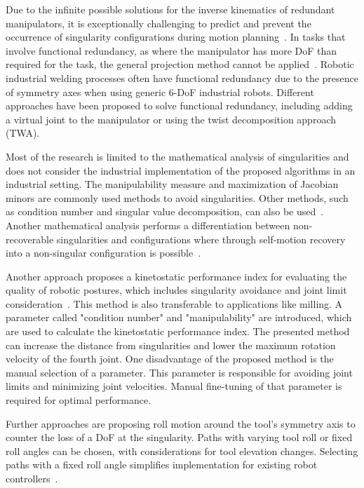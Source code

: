 Due to the infinite possible solutions for the inverse kinematics of redundant manipulators, it is exceptionally challenging to predict and prevent the occurrence of singularity configurations during motion planning~\cite{Shi.2021}. In tasks that involve functional redundancy, as where the manipulator has more \acrshort{DoF} than required for the task, the general projection method cannot be applied~\cite{Wei.2014}. Robotic industrial welding processes often have functional redundancy due to the presence of symmetry axes when using generic 6-\acrshort{DoF} industrial robots. Different approaches have been proposed to solve functional redundancy, including adding a virtual joint to the manipulator or using the twist decomposition approach (\acrshort{TWA}).

Most of the research is limited to the mathematical analysis of singularities and does not consider the industrial implementation of the proposed algorithms in an industrial setting. The manipulability measure and maximization of Jacobian minors are commonly used methods to avoid singularities. Other methods, such as condition number and singular value decomposition, can also be used~\cite{Stevenson.}. Another mathematical analysis performs a differentiation between non-recoverable singularities and configurations where through self-motion recovery into a non-singular configuration is possible~\cite{Bedrossian.2002}.

Another approach proposes a kinetostatic performance index for evaluating the quality of robotic postures, which includes singularity avoidance and joint limit consideration~\cite{Huo.2008}. This method is also transferable to applications like milling. A parameter called "condition number" and "manipulability" are introduced, which are used to calculate the kinetostatic performance index. The presented method can increase the distance from singularities and lower the maximum rotation velocity of the fourth joint. One disadvantage of the proposed method is the manual selection of a parameter. This parameter is responsible for avoiding joint limits and minimizing joint velocities. Manual fine-tuning of that parameter is required for optimal performance. 

Further approaches are proposing roll motion around the tool's symmetry axis to counter the loss of a \acrshort{DoF} at the singularity. Paths with varying tool roll or fixed roll angles can be chosen, with considerations for tool elevation changes. Selecting paths with a fixed roll angle simplifies implementation for existing robot controllers~\cite{Milenkovic.2021}.

